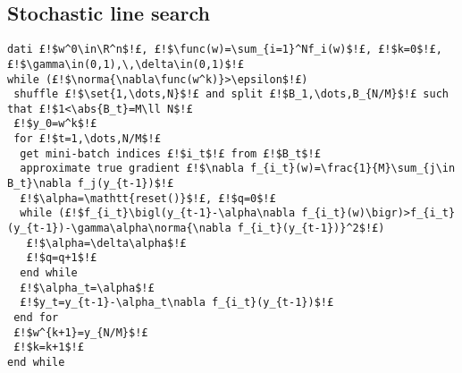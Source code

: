 
\subsection{Stochastic line search}

\begin{lstlisting}[style=simple,title={Mini-batch Gradient Descent with Armijo line search}]
dati £!$w^0\in\R^n$!£, £!$\func(w)=\sum_{i=1}^Nf_i(w)$!£, £!$k=0$!£, £!$\gamma\in(0,1),\,\delta\in(0,1)$!£
while (£!$\norma{\nabla\func(w^k)}>\epsilon$!£)
 shuffle £!$\set{1,\dots,N}$!£ and split £!$B_1,\dots,B_{N/M}$!£ such that £!$1<\abs{B_t}=M\ll N$!£
 £!$y_0=w^k$!£
 for £!$t=1,\dots,N/M$!£
  get mini-batch indices £!$i_t$!£ from £!$B_t$!£
  approximate true gradient £!$\nabla f_{i_t}(w)=\frac{1}{M}\sum_{j\in B_t}\nabla f_j(y_{t-1})$!£
  £!$\alpha=\mathtt{reset()}$!£, £!$q=0$!£
  while (£!$f_{i_t}\bigl(y_{t-1}-\alpha\nabla f_{i_t}(w)\bigr)>f_{i_t}(y_{t-1})-\gamma\alpha\norma{\nabla f_{i_t}(y_{t-1})}^2$!£)
   £!$\alpha=\delta\alpha$!£
   £!$q=q+1$!£
  end while
  £!$\alpha_t=\alpha$!£
  £!$y_t=y_{t-1}-\alpha_t\nabla f_{i_t}(y_{t-1})$!£
 end for
 £!$w^{k+1}=y_{N/M}$!£
 £!$k=k+1$!£
end while
\end{lstlisting}



















